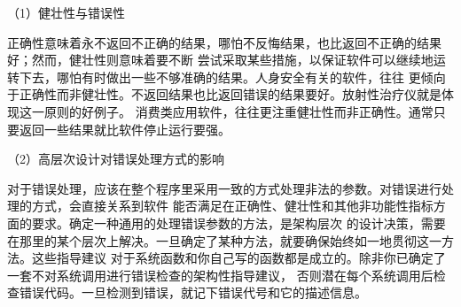 \documentclass{article}
\begin{document}
\par
（1）健壮性与错误性
\par
正确性意味着永不返回不正确的结果，哪怕不反悔结果，也比返回不正确的结果好；然而，健壮性则意味着要不断
尝试采取某些措施，以保证软件可以继续地运转下去，哪怕有时做出一些不够准确的结果。人身安全有关的软件，往往
更倾向于正确性而非健壮性。不返回结果也比返回错误的结果要好。放射性治疗仪就是体现这一原则的好例子。
消费类应用软件，往往更注重健壮性而非正确性。通常只要返回一些结果就比软件停止运行要强。

\par
（2）高层次设计对错误处理方式的影响
\par
对于错误处理，应该在整个程序里采用一致的方式处理非法的参数。对错误进行处理的方式，会直接关系到软件
能否满足在正确性、健壮性和其他非功能性指标方面的要求。确定一种通用的处理错误参数的方法，是架构层次
的设计决策，需要在那里的某个层次上解决。一旦确定了某种方法，就要确保始终如一地贯彻这一方法。这些指导建议
对于系统函数和你自己写的函数都是成立的。除非你已确定了一套不对系统调用进行错误检查的架构性指导建议，
否则潜在每个系统调用后检查错误代码。一旦检测到错误，就记下错误代号和它的描述信息。
\end{document}

